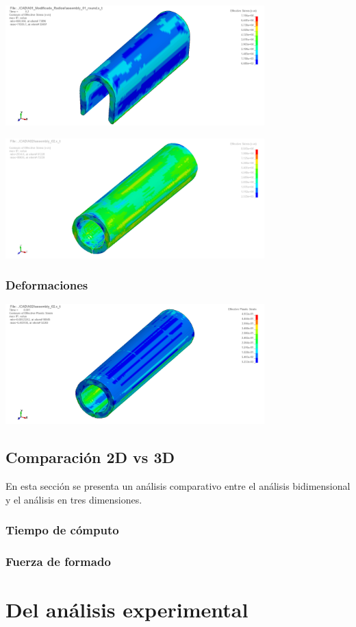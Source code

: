 \begin{center}
\includegraphics[width=0.75\textwidth]{src/ch4/von_mises_3D_01.png}
\label{fig:von_mises_3D_01}
\end{center}

\begin{center}
\includegraphics[width=0.75\textwidth]{src/ch4/von_mises_3D_02.png}
\label{fig:von_mises_3D_02}
\end{center}

\subsubsection{Deformaciones}

\begin{center}
\includegraphics[width=0.75\textwidth]{src/ch4/eqv_strain_01.png}
\label{fig:eqv_strain_01}
\end{center}


\subsection{Comparación 2D vs 3D}

En esta sección se presenta un análisis comparativo entre el análisis bidimensional 
y el análisis en tres dimensiones.

\subsubsection{Tiempo de cómputo}

\subsubsection{Fuerza de formado}


\section{Del análisis experimental}


